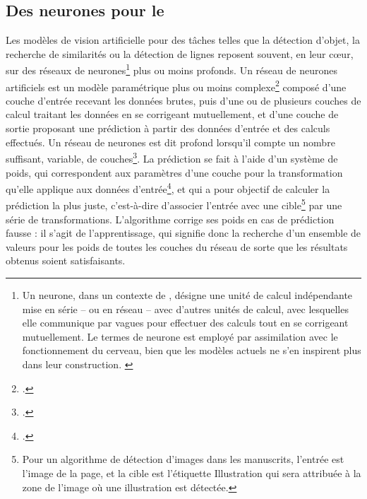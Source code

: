 
\subsection{Des \og neurones \fg pour le \dl}
Les modèles de vision artificielle pour des tâches telles que la détection d'objet, la recherche de similarités ou la détection de lignes reposent souvent, en leur cœur, sur des réseaux de neurones\footnote{Un neurone, dans un contexte de \ml, désigne une unité de calcul indépendante mise en série -- ou en réseau -- avec d'autres unités de calcul, avec lesquelles elle communique par vagues pour effectuer des calculs tout en se corrigeant mutuellement. Le termes de \og neurone \fg est employé par assimilation avec le fonctionnement du cerveau, bien que les modèles actuels ne s'en inspirent plus dans leur construction. \cite{azencottIntroductionAuMachine2018}} plus ou moins profonds. Un réseau de neurones artificiels est un modèle paramétrique plus ou moins complexe\footcite{azencottIntroductionAuMachine2018} composé d'une couche d'entrée recevant les données brutes, puis d'une ou de plusieurs couches de calcul traitant les données en se corrigeant mutuellement, et d'une couche de sortie proposant une prédiction à partir des données d'entrée et des calculs effectués. Un réseau de neurones est dit \og profond \fg lorsqu'il compte un nombre suffisant, variable, de couches\footcite{azencottIntroductionAuMachine2018}. La prédiction se fait à l'aide d'un système de poids, qui correspondent aux paramètres d'une couche pour la transformation qu'elle applique aux données d'entrée\footcite{cholletApprentissageProfondAvec2020a}, et qui a pour objectif de calculer la prédiction la plus juste, c'est-à-dire d'associer l'entrée avec une cible\footnote{Pour un algorithme de détection d'images dans les manuscrits, l'entrée est l'image de la page, et la cible est l'étiquette \og Illustration \fg qui sera attribuée à la zone de l'image où une illustration est détectée.} par une série de transformations. L'algorithme corrige ses poids en cas de prédiction fausse : il s'agit de l'apprentissage, qui signifie donc la recherche d'un ensemble de valeurs pour les poids de toutes les couches du réseau de sorte que les résultats obtenus soient satisfaisants.
    

